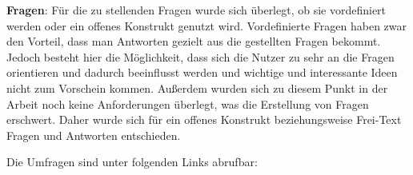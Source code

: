 \myNewSection
\textbf{Fragen}: %
Für die zu stellenden Fragen wurde sich überlegt, ob sie vordefiniert werden oder ein offenes Konstrukt genutzt wird. %
	Vordefinierte Fragen haben zwar den Vorteil, dass man Antworten gezielt aus die gestellten Fragen bekommt. %
	Jedoch besteht hier die Möglichkeit, dass sich die Nutzer zu sehr an die Fragen orientieren und dadurch beeinflusst werden und wichtige und interessante Ideen nicht zum Vorschein kommen. %
	Außerdem wurden sich zu diesem Punkt in der Arbeit noch keine Anforderungen überlegt, was die Erstellung von Fragen erschwert. %
Daher wurde sich für ein offenes Konstrukt beziehungsweise Frei-Text Fragen und Antworten entschieden.%

\myNewSection
Die Umfragen sind unter folgenden Links abrufbar: \myTodo%